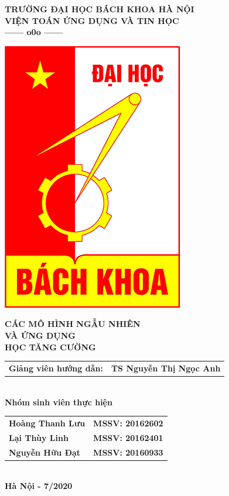 \documentclass[12pt,a4paper]{report}
\begin{document}
	\thisfancypage{%
		\setlength{\fboxsep}{0pt}%
		\fbox}{} %
	\thispagestyle{empty}
	\begin{center}
		\vspace*{0.1cm}
		\fontsize{14}{12}
		\textbf{TRƯỜNG ĐẠI HỌC BÁCH KHOA HÀ NỘI}\\
		\textbf{VIỆN TOÁN ỨNG DỤNG VÀ TIN HỌC}\\
		\textbf{------ o0o ------}
	\end{center}
	\vspace*{0.8cm}
	\begin{center}
		\includegraphics[scale=.5]{bk.png}
	\end{center}
	\vspace*{0.8cm}
	\begin{center}
		\fontsize{20}{18}
		\textbf{CÁC MÔ HÌNH NGẪU NHIÊN \\VÀ ỨNG DỤNG}\\
		\vspace*{0.8cm}
		\fontsize{18}{16}
		\textbf{HỌC TĂNG CƯỜNG}\\
	\end{center}
	\vspace*{0.7cm}
	\begin{center}
		\fontsize{14}{16}
		\begin{tabular}{ll}		
			\textbf{Giảng viên hướng dẫn:} & \textbf{TS Nguyễn Thị Ngọc Anh} 
		\end{tabular} \\
	\textbf{Nhóm sinh viên thực hiện}\\
	\begin{tabular}{ll}
		\textbf{Hoàng Thanh Lưu} & \textbf{MSSV: 20162602} \\
		\textbf{Lại Thùy Linh} & \textbf{MSSV: 20162401} \\
		\textbf{Nguyễn Hữu Đạt} & \textbf{MSSV: 20160933} \\
	\end{tabular}\\
		\vspace*{2cm}
		\fontsize{14}{16}
		\textbf{Hà Nội - 7/2020}
	\end{center}
\newpage
\end{document}
